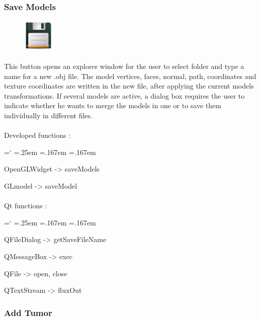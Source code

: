 \documentclass[12pt]{report}
\DeclareRobustCommand*{\ttfamily}{
  \origttfamily
  \hyphenchar\font=`\-\relax
  \fontdimen3\font=.25em\relax
  \fontdimen4\font=.167em\relax
  \fontdimen7\font=.167em\relax
}
\newenvironment{code}{\ttfamily}{}
\begin{document}
\subsubsection{Save Models}

\begin{figure}
\vspace{-20pt}
\includegraphics[width=1.5cm]{icons/save.png}
\end{figure}
\paragraph{}
	This button opens an explorer window for the user to select folder and type a name for a new .obj file. The model vertices, faces, normal, path, coordinates and texture coordinates are written in the new file, after applying the current models transformations. If several models are active, a dialog box requires the user to indicate whether he wants to merge the models in one or to save them individually in different files.

\paragraph{}
	Developed functions :

	\begin{code}
	OpenGLWidget -> saveModels

	GLmodel -> saveModel
	\end{code}

\paragraph{}
	Qt functions :

	\begin{code}
	QFileDialog -> getSaveFileName

	QMessageBox -> exec

	QFile -> open, close

	QTextStream -> fluxOut
	\end{code}



\subsubsection{Add Tumor} \label{subsubsec:tumor mode}
\end{document}
